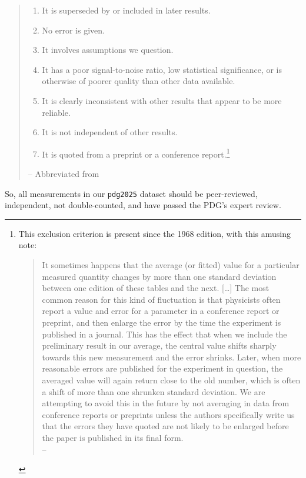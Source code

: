 \documentclass[12pt]{article}
\begin{document}
\begin{quote}
  \begin{enumerate}
  \item It is superseded by or included in later results.
  \item No error is given.
  \item It involves assumptions we question.
  \item It has a poor signal-to-noise ratio, low statistical significance, or is otherwise of poorer quality than other data available.
  \item It is clearly inconsistent with other results that appear to be more reliable.
  \item It is not independent of other results.
  \item It is quoted from a preprint or a conference report.\footnote{
    This exclusion criterion is present since the 1968 edition, with this amusing note:
    \begin{quote}
      It sometimes happens that the average (or fitted) value for a particular measured quantity changes by more than one standard deviation between one edition of these tables and the next. [\ldots] The most common reason for this kind of fluctuation is that physicists often report a value and error for a parameter in a conference report or preprint, and then enlarge the error by the time the experiment is published in a journal. This has the effect that when we include the preliminary result in our average, the central value shifts sharply towards this new measurement and the error shrinks. Later, when more reasonable errors are published for the experiment in question, the averaged value will again return close to the old number, which is often a shift of more than one shrunken standard deviation. We are attempting to avoid this in the future by not averaging in data from conference reports or preprints unless the authors specifically write us that the errors they have quoted are not likely to be enlarged before the paper is published in its final form. \\ \hfill -- \citet{rosenfeld1968data}
    \end{quote}
  }
  \end{enumerate} \hfill -- Abbreviated from \citet[Section 5.1]{navas2024review}
\end{quote}

So, all measurements in our \texttt{pdg2025} dataset should be peer-reviewed, independent, not double-counted, and have passed the PDG's expert review.
\end{document}
